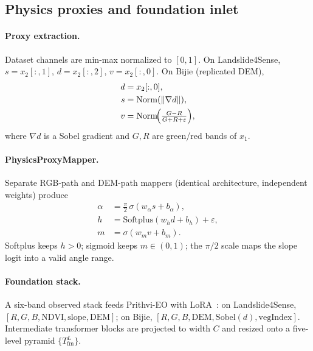 \subsection{Physics proxies and foundation inlet}
\label{sec:proxies}
\paragraph{Proxy extraction.}
Dataset channels are min-max normalized to \([0,1]\). On Landslide4Sense,
\(s=x_2[:,1]\), \(d=x_2[:,2]\), \(v=x_2[:,0]\).
On Bijie (replicated DEM),
\begin{equation}
\label{eq:bijie-proxy}
\begin{aligned}
d&=x_2[:,0],\\
s&=\mathrm{Norm}(\|\nabla d\|),\\
v&=\mathrm{Norm}\!\Bigl(\tfrac{G-R}{G+R+\varepsilon}\Bigr),
\end{aligned}
\end{equation}
where \(\nabla d\) is a Sobel gradient and \(G,R\) are green/red bands of \(x_1\).

\paragraph{PhysicsProxyMapper.}
Separate RGB-path and DEM-path mappers (identical architecture, independent weights) produce
\begin{equation}
\label{eq:proxies}
\begin{aligned}
\alpha&=\tfrac{\pi}{2}\,\sigma(w_\alpha s+b_\alpha),\\
h&=\mathrm{Softplus}(w_h d+b_h)+\varepsilon,\\
m&=\sigma(w_m v+b_m).
\end{aligned}
\end{equation}
Softplus keeps \(h>0\); sigmoid keeps \(m\in(0,1)\); the \(\pi/2\) scale maps the slope logit into a valid angle range.

\paragraph{Foundation stack.}
A six-band observed stack feeds Prithvi-EO with LoRA~\cite{szink2024prithvi,houlsby2019lora}: on Landslide4Sense, \([R,G,B,\mathrm{NDVI},\mathrm{slope},\mathrm{DEM}]\); on Bijie, \([R,G,B,\mathrm{DEM},\mathrm{Sobel}(d),\mathrm{vegIndex}]\). Intermediate transformer blocks are projected to width \(C\) and resized onto a five-level pyramid \(\{T_{\mathrm{fm}}^{L}\}\).

